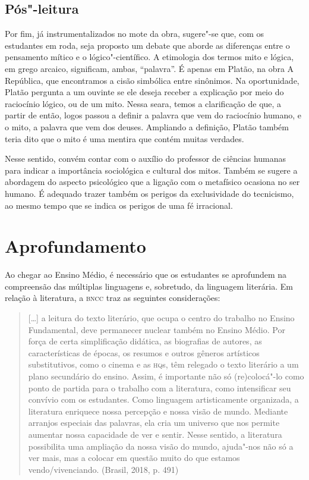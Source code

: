 \documentclass[12pt]{extarticle}
\begin{document}
\subsection{Pós"-leitura}

Por fim, já instrumentalizados no mote da obra, sugere"-se
que, com os estudantes em roda, seja proposto um debate que aborde as
diferenças entre o pensamento mítico e o lógico"-científico. A etimologia
dos termos mito e lógica, em grego arcaico, significam, ambas,
``palavra''. É apenas em Platão, na obra A República, que encontramos a
cisão simbólica entre sinônimos. Na oportunidade, Platão pergunta a um
ouvinte se ele deseja receber a explicação por meio do raciocínio
lógico, ou de um mito. Nessa seara, temos a clarificação de que, a
partir de então, logos passou a definir a palavra que vem do raciocínio
humano, e o mito, a palavra que vem dos deuses. Ampliando a definição,
Platão também teria dito que o mito é uma mentira que contém muitas
verdades.

Nesse sentido, convém contar com o auxílio do professor de ciências
humanas para indicar a importância sociológica e cultural dos mitos.
Também se sugere a abordagem do aspecto psicológico que a ligação com o
metafísico ocasiona no ser humano. É adequado trazer também os perigos
da exclusividade do tecnicismo, ao mesmo tempo que se indica os perigos
de uma fé irracional.

\section{Aprofundamento}

Ao chegar ao Ensino Médio, é necessário que os estudantes se aprofundem
na compreensão das múltiplas linguagens e, sobretudo, da linguagem
literária. Em relação à literatura, a \textsc{bncc} traz as seguintes
considerações:


\begin{quote}
{[}\ldots{}{]} a leitura do texto literário, que ocupa o centro do trabalho
no Ensino Fundamental, deve permanecer nuclear também no Ensino Médio.
Por força de certa simplificação didática, as biografias de autores, as
características de épocas, os resumos e outros gêneros artísticos
substitutivos, como o cinema e as \textsc{hq}s, têm relegado o texto literário a
um plano secundário do ensino. Assim, é importante não só (re)colocá"-lo
como ponto de partida para o trabalho com a literatura, como
intensificar seu convívio com os estudantes. Como linguagem
artisticamente organizada, a literatura enriquece nossa percepção e
nossa visão de mundo. Mediante arranjos especiais das palavras, ela cria
um universo que nos permite aumentar nossa capacidade de ver e sentir.
Nesse sentido, a literatura possibilita uma ampliação da nossa visão do
mundo, ajuda"-nos não só a ver mais, mas a colocar em questão muito do
que estamos vendo/vivenciando. (Brasil, 2018, p. 491)
\end{quote}
\end{document}
